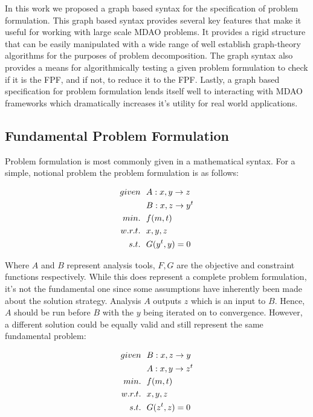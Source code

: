     In this work we proposed a graph based syntax for the specification of problem formulation. This graph based syntax provides several key
    features that make it useful for working with large scale MDAO problems. It provides a rigid structure that can be easily manipulated 
    with a wide range of well establish graph-theory algorithms for the purposes of problem decomposition. The graph syntax also 
    provides a means for algorithmically testing a given problem formulation to check if it is the FPF, and if not, to reduce it to the FPF. 
    Lastly, a graph based specification for problem formulation lends itself well to interacting with MDAO frameworks which dramatically 
    increases it's utility for real world applications. 


\subsection{Fundamental Problem Formulation}
    Problem formulation is most commonly given in a mathematical syntax. For a simple, notional problem 
    the problem formulation is as follows: 

    \begin{align}
        given & \ \ A: {x,y} \rightarrow {z}
        \\      & \ \ B: {x,z} \rightarrow {y^t}
        \\min. &\ \ f(m,t) \notag
        \\w.r.t. & \ \ x,y,z \notag
        \\s.t. & \ \ G(y^t,y) = 0
        \label{eqn:simple}
    \end{align}

    Where $A$ and $B$ represent analysis tools, $F,G$ are the objective and constraint functions respectively. 
    While this does represent a complete problem formulation, 
    it's not the fundamental one since some assumptions have inherently been made about the solution 
    strategy. Analysis $A$ outputs $z$ which is an input to $B$. Hence, $A$ should be run before $B$ with 
    the $y$ being iterated on to convergence. However, a different solution could be equally valid and still represent
    the same fundamental problem: 

    \begin{align}
        given & \ \ B: {x,z} \rightarrow {y}
        \\      & \ \ A: {x,y} \rightarrow {z^t}
        \\min. &\ \ f(m,t) \notag
        \\w.r.t. & \ \ x,y,z \notag
        \\s.t. & \ \ G(z^t,z) = 0
        \label{eqn:simple2}
    \end{align}


